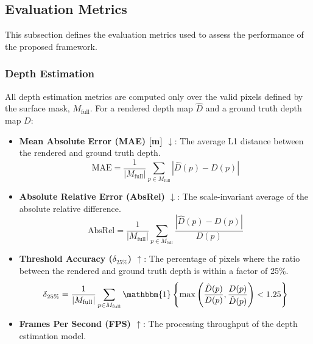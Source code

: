 
\subsection{Evaluation Metrics}
This subsection defines the evaluation metrics used to assess the performance of the proposed framework.

\subsubsection{Depth Estimation}
All depth estimation metrics are computed only over the valid pixels defined by the surface mask, $M_{\text{full}}$. For a rendered depth map $\hat{D}$ and a ground truth depth map $D$:
\begin{itemize}
	\item \textbf{Mean Absolute Error (MAE) [m] $\downarrow$}: The average L1 distance between the rendered and ground truth depth.
	      \begin{equation}
		      \text{MAE} = \frac{1}{|M_{\text{full}}|} \sum_{p \in M_{\text{full}}} |\hat{D}(p) - D(p)|
	      \end{equation}

	\item \textbf{Absolute Relative Error (AbsRel) $\downarrow$}: The scale-invariant average of the absolute relative difference.
	      \begin{equation}
		      \text{AbsRel} = \frac{1}{|M_{\text{full}}|} \sum_{p \in M_{\text{full}}} \frac{|\hat{D}(p) - D(p)|}{D(p)}
	      \end{equation}

	\item \textbf{Threshold Accuracy ($\delta_{25\%}$) $\uparrow$}: The percentage of pixels where the ratio between the rendered and ground truth depth is within a factor of 25\%.
	      \begin{equation}
		      \delta_{25\%} = \frac{1}{|M_{\text{full}}|} \sum_{p \in M_{\text{full}}} \mathbbm{1}\left\{\max\left(\frac{\hat{D}(p)}{D(p)}, \frac{D(p)}{\hat{D}(p)}\right) < 1.25\right\}
	      \end{equation}

	\item \textbf{Frames Per Second (FPS) $\uparrow$}: The processing throughput of the depth estimation model.
\end{itemize}

